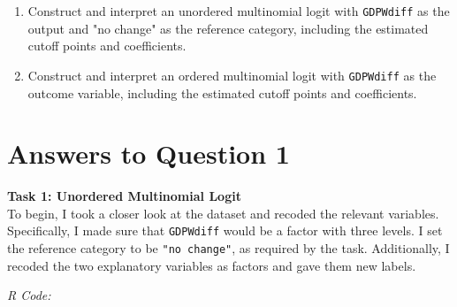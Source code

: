 \documentclass[12pt,letterpaper]{article}
\begin{document}
\begin{enumerate}
	\item Construct and interpret an unordered multinomial logit with \texttt{GDPWdiff} as the output and "no change" as the reference category, including the estimated cutoff points and coefficients.
	\item Construct and interpret an ordered multinomial logit with \texttt{GDPWdiff} as the outcome variable, including the estimated cutoff points and coefficients.
	
	
\end{enumerate}

\section*{Answers to Question 1}
\vspace{.25cm}

\noindent\textbf{Task 1: Unordered Multinomial Logit}\\
\noindent To begin, I took a closer look at the dataset and recoded the relevant variables. Specifically, I made sure that  \texttt{GDPWdiff}  would be a factor with three levels. I set the reference category to be \texttt{"no change"}, as required by the task.  Additionally, I recoded the two explanatory variables as factors and gave them new labels. 

\noindent\textit{R Code:}
  
\end{document}

